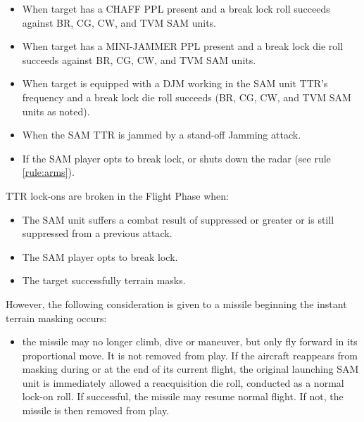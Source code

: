 \begin{itemize}
    \item When target has a CHAFF PPL present and a break lock roll succeeds against BR, CG, CW, and TVM SAM units.

    \item When target has a MINI-JAMMER PPL present and a break lock die roll succeeds against BR, CG, CW, and TVM SAM units.

    \item When target is equipped with a DJM working in the SAM unit TTR's frequency and a break lock die roll succeeds (BR, CG, CW, and TVM SAM units as noted). 


    \item When the SAM TTR is jammed by a stand-off Jamming attack.
    
    \item If the SAM player opts to break lock, or shuts down the radar (see rule \ref{rule:arms}).

\end{itemize}


TTR lock-ons are broken in the Flight Phase when:
\begin{itemize}

    \item The SAM unit suffers a combat result of suppressed or greater or is still suppressed from a previous attack.

    \item The SAM player opts to break lock.

    \item The target successfully terrain masks.

\end{itemize}

However, the following consideration is given to a missile beginning the instant terrain masking occurs:

\begin{itemize}
    \item 
the missile may no longer climb, dive or maneuver, but only fly forward in its proportional move. It is not removed from play. If the aircraft reappears from masking during or at the end of its current flight, the original launching SAM unit is immediately allowed a reacquisition die roll, conducted as a normal lock-­on roll. If successful, the missile may resume normal flight. If not, the missile is then removed from play.
\end{itemize}

